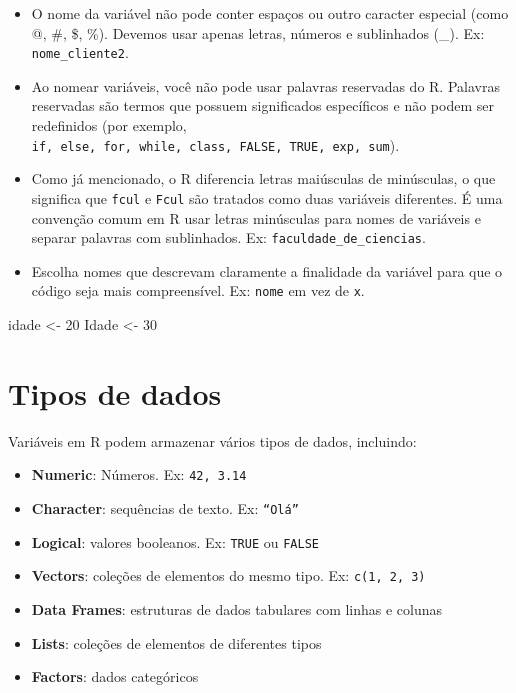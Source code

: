 \documentclass[
]{book}
\newenvironment{Shaded}{\begin{snugshade}}{\end{snugshade}}
\newcommand{\DecValTok}[1]{\textcolor[rgb]{0.00,0.00,0.81}{#1}}
\newcommand{\NormalTok}[1]{#1}
\newcommand{\OtherTok}[1]{\textcolor[rgb]{0.56,0.35,0.01}{#1}}
\theoremstyle{definition}
\theoremstyle{definition}
\theoremstyle{definition}
\theoremstyle{definition}
\theoremstyle{remark}
\begin{document}
\begin{itemize}
\item
  O nome da variável não pode conter espaços ou outro caracter especial (como @, \#, \$, \%). Devemos usar apenas letras, números e sublinhados (\_). Ex: \texttt{nome\_cliente2}.
\item
  Ao nomear variáveis, você não pode usar palavras reservadas do R. Palavras reservadas são termos que possuem significados específicos e não podem ser redefinidos (por exemplo, \texttt{if,\ else,\ for,\ while,\ class,\ FALSE,\ TRUE,\ exp,\ sum}).
\item
  Como já mencionado, o R diferencia letras maiúsculas de minúsculas, o que significa que \texttt{fcul} e \texttt{Fcul} são tratados como duas variáveis diferentes. É uma convenção comum em R usar letras minúsculas para nomes de variáveis e separar palavras com sublinhados. Ex: \texttt{faculdade\_de\_ciencias}.
\item
  Escolha nomes que descrevam claramente a finalidade da variável para que o código seja mais compreensível. Ex: \texttt{nome} em vez de \texttt{x}.
\end{itemize}

\begin{Shaded}
\begin{Highlighting}[]
\NormalTok{idade }\OtherTok{\textless{}{-}} \DecValTok{20}
\NormalTok{Idade }\OtherTok{\textless{}{-}} \DecValTok{30}
\end{Highlighting}
\end{Shaded}

\section{Tipos de dados}\label{tipos-de-dados}

Variáveis em R podem armazenar vários tipos de dados, incluindo:

\begin{itemize}
\item
  \textbf{Numeric}: Números. Ex: \texttt{42,\ 3.14}
\item
  \textbf{Character}: sequências de texto. Ex: \texttt{“Olá”}
\item
  \textbf{Logical}: valores booleanos. Ex: \texttt{TRUE} ou \texttt{FALSE}
\item
  \textbf{Vectors}: coleções de elementos do mesmo tipo. Ex: \texttt{c(1,\ 2,\ 3)}
\item
  \textbf{Data Frames}: estruturas de dados tabulares com linhas e colunas
\item
  \textbf{Lists}: coleções de elementos de diferentes tipos
\item
  \textbf{Factors}: dados categóricos
\end{itemize}
\end{document}
